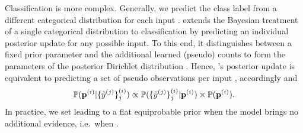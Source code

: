 Classification is more complex. Generally, we predict the class label  from a different categorical distribution  for each input . \PostNetacro extends the Bayesian treatment of a single categorical distribution to classification by predicting an individual posterior update for any possible input. To this end, it distinguishes between a fixed prior parameter  and the additional learned (pseudo) counts \smash{$\bm{\beta}\dataix$} to form the parameters of the posterior Dirichlet distribution . 
Hence, \PostNetacro's posterior update is equivalent to predicting a set of pseudo observations  per input , accordingly  and
\begin{equation}
    \begin{aligned}
    \mathbb{P}(\mathbf{p}^{(i)}|\{\tilde{y}^{(j)}\}_j^{(i)}) \propto \mathbb{P}(\{\tilde{y}^{(j)}\}_j^{(i)}|\mathbf{p}^{(i)}) \times \mathbb{P}(\mathbf{p}^{(i)}).
    \end{aligned}
\end{equation}
In practice, we set  leading to a flat equiprobable prior when the model brings no additional evidence, i.e.\ when . 


